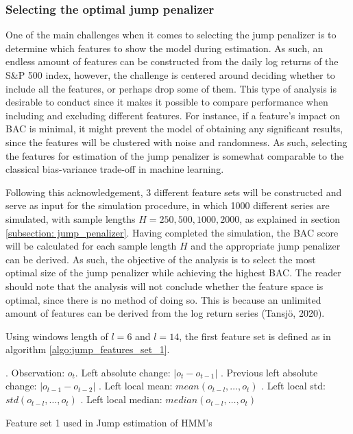 \subsubsection{Selecting the optimal jump penalizer}
\label{subsubsection: optimal jump penalizer}
One of the main challenges when it comes to selecting the jump penalizer is to determine which features to show the model during estimation. As such, an endless amount of features can be constructed from the daily log returns of the S\&P 500 index, however, the challenge is centered around deciding whether to include all the features, or perhaps drop some of them. This type of analysis is desirable to conduct since it makes it possible to compare performance when including and excluding different features. For instance, if a feature's impact on BAC is minimal, it might prevent the model of obtaining any significant results, since the features will be clustered with noise and randomness. As such, selecting the features for estimation of the jump penalizer is somewhat comparable to the classical bias-variance trade-off in machine learning. 

Following this acknowledgement, 3 different feature sets will be constructed and serve as input for the simulation procedure, in which 1000 different series are simulated, with sample lengths $H = 250, 500, 1000, 2000$, as explained in section \ref{subsection: jump_penalizer}. Having completed the simulation, the BAC score will be calculated for each sample length $H$ and the appropriate jump penalizer can be derived. As such, the objective of the analysis is to select the most optimal size of the jump penalizer while achieving the highest BAC. The reader should note that the analysis will not conclude whether the feature space is optimal, since there is no method of doing so. This is because an unlimited amount of features can be derived from the log return series (Tansjö, 2020). 

Using windows length of $l = 6$ and $l = 14$, the first feature set is defined as in algorithm \ref{algo:jump_features_set_1}. 

\begin{algorithm}[H]
. Observation: $o_t$. Left absolute change: $|o_t-o_{t-1}|$ . Previous left absolute change: $|o_{t-1}-o_{t-2}|$ . Left local mean: $mean(o_{t-l},\ldots,o_{t})$ . Left local std: $std(o_{t-l},\ldots, o_{t})$ . Left local median: $median(o_{t-l},\ldots,o_{t})$ \;
\BlankLine

\caption{Feature set 1 used in Jump estimation of HMM's}
\label{algo:jump_features_set_1}
\end{algorithm}

